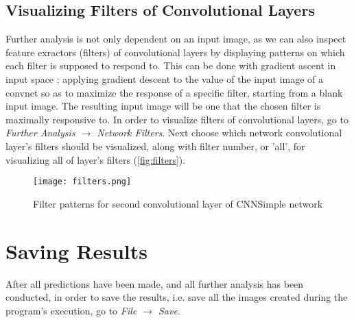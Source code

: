 \subsection{Visualizing Filters of Convolutional Layers}

Further analysis is not only dependent on an input image, as we can also inspect feature exractors (filters) of convolutional layers by displaying patterns on which each filter is supposed to respond to. This can be done with gradient ascent in input space : applying gradient descent to the value of the input image of a convnet so as to maximize the response of a specific filter, starting from a blank input image. The resulting input image will be one that the chosen filter is maximally responsive to. In order to visualize filters of convolutional layers, go to \emph{Further Analysis $\rightarrow$ Network Filters}.  Next choose which network convolutional layer's filters should be visualized, along with filter number, or 'all', for visualizing all of layer's filters  (\textcolor{red}{\autoref{fig:filters}}).

\begin{figure}[h]
	\centering
	\texttt{[image: filters.png]}
	\caption{Filter patterns for second convolutional layer of CNNSimple network}
	\label{fig:filters}
\end{figure}

\clearpage

\section{Saving Results}
After all predictions have been made, and all further analysis has been conducted, in order to save the results, i.e. save all the images created during the program's execution, go to \emph{File $\rightarrow$ Save}.
